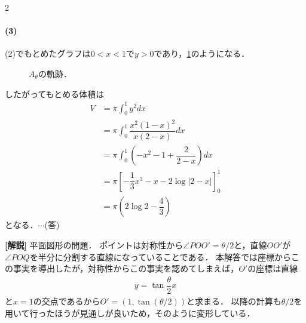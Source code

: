 \documentclass[../../main.tex]{subfiles}
\begin{document}
\begin{multicols}{2}
  \paragraph{(3)}
  (2)でもとめたグラフは$0<x<1$で$y>0$であり，\cref{1996-1:fig:3}のようになる．

  \begin{figure}[H]
    \caption{$A_{\theta}$の軌跡．}
    \label{1996-1:fig:3}
  \end{figure}

  したがってもとめる体積は
  \begin{align}
    V
    & = \pi \int_0^1 y^2 dx                                   \\
    & = \pi \int_0^1 \dfrac{x^2(1-x)^2}{x(2-x)} dx             \\
    & = \pi \int_0^1 \left(-x^2 - 1 + \dfrac{2}{2-x}\right) dx \\
    & = \pi \left[-\dfrac{1}{3}x^3 - x - 2\log|2-x|\right]_0^1 \\
    & = \pi \left(2\log 2 - \dfrac{4}{3}\right)
  \end{align}
  となる．$\cdots$(答)

  {\bf [解説]}
  平面図形の問題．
  ポイントは対称性から$\angle POO'=\theta/2$と，直線$OO'$が$\angle POQ$を半分に分割する直線になっていることである．
  本解答では座標からこの事実を導出したが，対称性からこの事実を認めてしまえば，$O'$の座標は直線
  \begin{align}
    y = \tan\dfrac{\theta}{2} x
  \end{align}
  と$x=1$の交点であるから$O'=(1,\tan(\theta/2))$と求まる．
  以降の計算も$\theta/2$を用いて行ったほうが見通しが良いため，そのように変形している．

  \newpage
\end{multicols}
\end{document}
